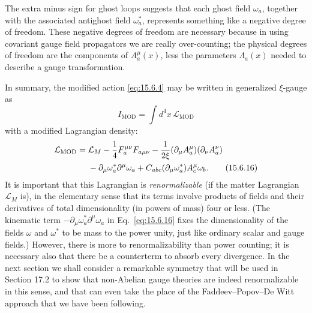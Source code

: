 The extra minus sign for ghost loops suggests that each ghost field
$\omega_a$, together with the associated antighost field
$\omega_a^*$, represents something like a negative degree of freedom.
These negative degrees of freedom are necessary because in using covariant
gauge field propagators we are really over-counting; the physical degrees of
freedom are the components of $A_a^\mu(x)$, less the parameters
$\Lambda_a(x)$ needed to describe a gauge transformation.

In summary, the modified action \eqref{eq:15.6.4} may be written in generalized
$\xi$-gauge as
\begin{equation}
  I_{\mathrm{MOD}}=\int d^4x\,\mathcal L_{\mathrm{MOD}}
  \tag{15.6.15}\label{eq:15.6.15}
\end{equation}
with a modified Lagrangian density:
\begin{align}
  \mathcal L_{\mathrm{MOD}}={}&\mathcal L_M
  -\frac14F_a^{\mu\nu}F_{a\mu\nu}
  -\frac{1}{2\xi}(\partial_\mu A_a^\mu)
  (\partial_\nu A_a^\nu)
  \notag\\
  &-\partial_\mu\omega_a^*\partial^\mu\omega_a
  +C_{abc}(\partial_\mu\omega_a^*)
  A_c^\mu\omega_b.
  \tag{15.6.16}\label{eq:15.6.16}
\end{align}
It is important that this Lagrangian is \emph{renormalizable} (if the matter
Lagrangian $\mathcal L_M$ is), in the elementary sense that its terms involve
products of fields and their derivatives of total dimensionality (in powers
of mass) four or less. (The kinematic term
$-\partial_\mu\omega_a^*\partial^\mu\omega_a$ in
Eq.~\eqref{eq:15.6.16} fixes the dimensionality of the fields $\omega$ and
$\omega^*$ to be mass to the power unity, just like ordinary scalar and gauge
fields.) However, there is more to renormalizability than power counting; it
is necessary also that there be a counterterm to absorb every divergence. In
the next section we shall consider a remarkable symmetry that will be used in
Section 17.2 to show that non-Abelian gauge theories are indeed renormalizable
in this sense, and that can even take the place of the Faddeev--Popov--De Witt
approach that we have been following.
